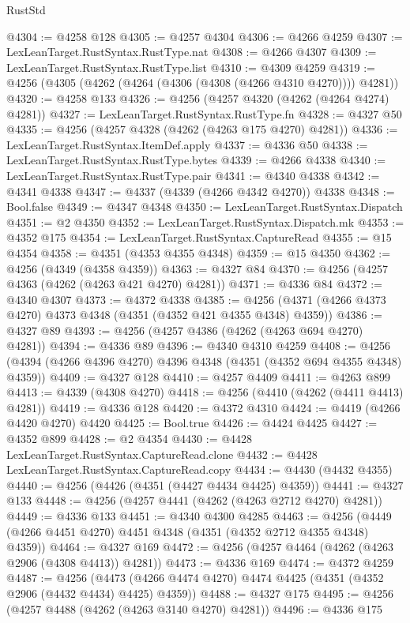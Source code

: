 \begin{lexlean}{RustStd}
\begin{coremodule}
@4304 := @4258 @128
@4305 := @4257 @4304
@4306 := @4266 @4259
@4307 := LexLeanTarget.RustSyntax.RustType.nat
@4308 := @4266 @4307
@4309 := LexLeanTarget.RustSyntax.RustType.list
@4310 := @4309 @4259
@4319 := @4256 (@4305 (@4262 (@4264 (@4306 (@4308 (@4266 @4310 @4270)))) @4281))
@4320 := @4258 @133
@4326 := @4256 (@4257 @4320 (@4262 (@4264 @4274) @4281))
@4327 := LexLeanTarget.RustSyntax.RustType.fn
@4328 := @4327 @50
@4335 := @4256 (@4257 @4328 (@4262 (@4263 @175 @4270) @4281))
@4336 := LexLeanTarget.RustSyntax.ItemDef.apply
@4337 := @4336 @50
@4338 := LexLeanTarget.RustSyntax.RustType.bytes
@4339 := @4266 @4338
@4340 := LexLeanTarget.RustSyntax.RustType.pair
@4341 := @4340 @4338
@4342 := @4341 @4338
@4347 := @4337 (@4339 (@4266 @4342 @4270)) @4338
@4348 := Bool.false
@4349 := @4347 @4348
@4350 := LexLeanTarget.RustSyntax.Dispatch
@4351 := @2 @4350
@4352 := LexLeanTarget.RustSyntax.Dispatch.mk
@4353 := @4352 @175
@4354 := LexLeanTarget.RustSyntax.CaptureRead
@4355 := @15 @4354
@4358 := @4351 (@4353 @4355 @4348)
@4359 := @15 @4350
@4362 := @4256 (@4349 (@4358 @4359))
@4363 := @4327 @84
@4370 := @4256 (@4257 @4363 (@4262 (@4263 @421 @4270) @4281))
@4371 := @4336 @84
@4372 := @4340 @4307
@4373 := @4372 @4338
@4385 := @4256 (@4371 (@4266 @4373 @4270) @4373 @4348 (@4351 (@4352 @421 @4355 @4348) @4359))
@4386 := @4327 @89
@4393 := @4256 (@4257 @4386 (@4262 (@4263 @694 @4270) @4281))
@4394 := @4336 @89
@4396 := @4340 @4310 @4259
@4408 := @4256 (@4394 (@4266 @4396 @4270) @4396 @4348 (@4351 (@4352 @694 @4355 @4348) @4359))
@4409 := @4327 @128
@4410 := @4257 @4409
@4411 := @4263 @899
@4413 := @4339 (@4308 @4270)
@4418 := @4256 (@4410 (@4262 (@4411 @4413) @4281))
@4419 := @4336 @128
@4420 := @4372 @4310
@4424 := @4419 (@4266 @4420 @4270) @4420
@4425 := Bool.true
@4426 := @4424 @4425
@4427 := @4352 @899
@4428 := @2 @4354
@4430 := @4428 LexLeanTarget.RustSyntax.CaptureRead.clone
@4432 := @4428 LexLeanTarget.RustSyntax.CaptureRead.copy
@4434 := @4430 (@4432 @4355)
@4440 := @4256 (@4426 (@4351 (@4427 @4434 @4425) @4359))
@4441 := @4327 @133
@4448 := @4256 (@4257 @4441 (@4262 (@4263 @2712 @4270) @4281))
@4449 := @4336 @133
@4451 := @4340 @4300 @4285
@4463 := @4256 (@4449 (@4266 @4451 @4270) @4451 @4348 (@4351 (@4352 @2712 @4355 @4348) @4359))
@4464 := @4327 @169
@4472 := @4256 (@4257 @4464 (@4262 (@4263 @2906 (@4308 @4413)) @4281))
@4473 := @4336 @169
@4474 := @4372 @4259
@4487 := @4256
    (@4473 (@4266 @4474 @4270) @4474 @4425 (@4351 (@4352 @2906 (@4432 @4434) @4425) @4359))
@4488 := @4327 @175
@4495 := @4256 (@4257 @4488 (@4262 (@4263 @3140 @4270) @4281))
@4496 := @4336 @175

\end{coremodule}
\end{lexlean}
